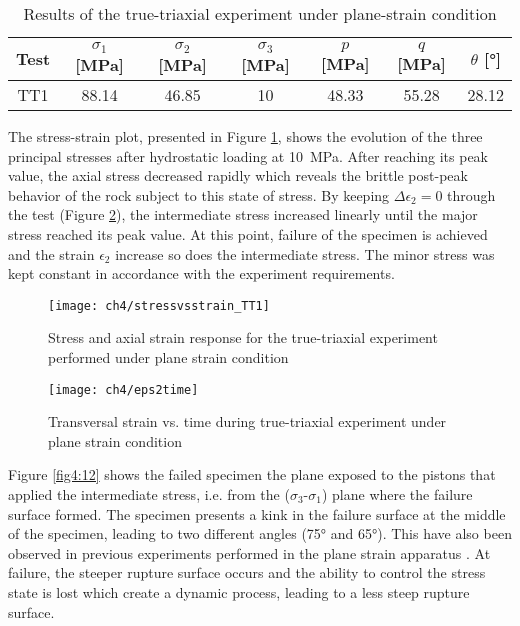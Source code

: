 \begin{table}
    \centering
    \captionsetup{justification=centering}
    \caption{Results of the true-triaxial experiment under plane-strain condition}
    \begin{tabular}{ccccccc}
        \hline
        Test & $\sigma_1$ [\si{MPa}] & $\sigma_2$ [\si{MPa}] & $\sigma_3$ [\si{MPa}] & $p$ [\si{MPa}] & $q$ [\si{MPa}] & $\theta$ [\si{\degree}] \\
        \hline
        \hline
        TT1 &88.14 & 46.85 & 10 & 48.33 & 55.28 & 28.12 \\
        \hline
    \end{tabular}
    \label{tb4:TT1}
\end{table}

The stress-strain plot, presented in Figure \ref{fig4:10}, shows the evolution of the three principal stresses after hydrostatic loading at \SI{10}{MPa}. After reaching its peak value, the axial stress decreased rapidly which reveals the brittle post-peak behavior of the rock subject to this state of stress.  By keeping $\Delta\epsilon_2 = 0$  through the test (Figure \ref{fig4:11}), the intermediate stress increased linearly until the major stress reached its peak value. At this point, failure of the specimen is achieved and the strain $\epsilon_2$ increase so does the intermediate stress. The minor stress was kept constant in accordance with the experiment requirements.

\begin{figure}[!]
    \centering
    \texttt{[image: ch4/stressvsstrain\_TT1]}
    \captionsetup{justification=centering}
    \caption{Stress and axial strain response for the true-triaxial experiment performed under plane strain condition}
    \label{fig4:10}
\end{figure} 


\begin{figure}[!]
    \centering
    \texttt{[image: ch4/eps2time]}
    \captionsetup{justification=centering}
    \caption{Transversal strain vs. time during true-triaxial experiment under plane strain condition}
    \label{fig4:11}
\end{figure} 

Figure \ref{fig4:12} shows the failed specimen the plane exposed to the pistons that applied the intermediate stress, i.e. from the ($\sigma_3$-$\sigma_1$) plane where the failure surface formed. The specimen presents a kink in the failure surface at the middle of the specimen, leading to two different angles (\ang{75} and \ang{65}). This have also been observed in previous experiments performed in the plane strain apparatus \cite{Labuz1996}. At failure, the steeper rupture surface occurs and the ability to control the stress state is lost which create a dynamic process, leading to a less steep rupture surface. 

